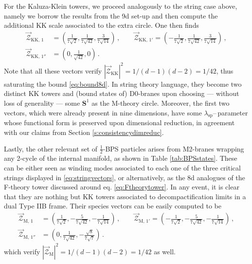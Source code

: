 For the Kaluza-Klein towers, we proceed analogously to the string case above, namely we borrow the results from the 9d set-up and then compute the additional KK scale associated to the extra circle. One then finds
%
\begin{equation} \label{eq:KKvectors}
\begin{split} 
	\vec{\mathcal{Z}}_{\text{KK},\, 1} &= \left( \frac{1}{7\sqrt{2}} , \frac{1}{7 \sqrt{42}}, \frac{3}{7 \sqrt{14}} \right) \, , \qquad \vec{\mathcal{Z}}_{\text{KK},\, 1'} = \left( -\frac{1}{7\sqrt{2}} , \frac{1}{7 \sqrt{42}}, \frac{3}{7 \sqrt{14}} \right) \, ,\\
	\vec{\mathcal{Z}}_{\text{KK},\, 1''} &= \left( 0 , \frac{1}{\sqrt{42}}, 0 \right) \, .
\end{split}
\end{equation}
%
Note that all these vectors verify $|\vec{\mathcal{Z}}_{\text{KK}}|^2=1/(d-1)(d-2)=1/42$, thus saturating the bound \eqref{eq:bound8d}. In string theory language, they become two distinct KK towers and (bound states of) D0-branes upon choosing --- without loss of generality --- some $\mathbf{S}^1$ as the M-theory circle. Moreover, the first two vectors, which were already present in nine dimensions, have some $\lambda_{\text{sp}}$--\,parameter whose functional form is preserved upon dimensional reduction, in agreement with our claims from Section \ref{s:consistencydimreduc}.

Lastly, the other relevant set of $\frac{1}{2}$-BPS particles arises from M2-branes wrapping any 2-cycle of the internal manifold, as shown in Table \ref{tab:BPSstates}. These can be either seen as winding modes associated to each one of the three critical strings displayed in \eqref{eq:stringvectors}, or alternatively, as the 8d analogues of the F-theory tower discussed around eq. \eqref{eq:Ftheorytower}. In any event, it is clear that they are nothing but KK towers associated to decompactification limits in a dual Type IIB frame. Their species vectors can be easily computed to be
%
\begin{equation} \label{eq:M2vectors}
\begin{split} 
	\vec{\mathcal{Z}}_{\text{M},\, 1} &= \left( \frac{1}{7\sqrt{2}}, -\frac{5}{7 \sqrt{42}}, -\frac{1}{7 \sqrt{14}} \right) \, , \qquad \vec{\mathcal{Z}}_{\text{M},\, 1'} = \left( -\frac{1}{7\sqrt{2}}, -\frac{5}{7 \sqrt{42}}, -\frac{1}{7 \sqrt{14}} \right) \, ,\\
	\vec{\mathcal{Z}}_{\text{M},\, 1''} &= \left( 0, \frac{1}{7 \sqrt{42}}, -\frac{\sqrt{8}}{7 \sqrt{7}} \right)\, .
\end{split}
\end{equation}
%
which verify $|\vec{\mathcal{Z}}_{\text{M}}|^2=1/(d-1)(d-2)=1/42$ as well. 


